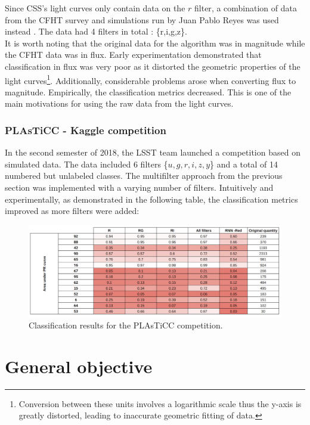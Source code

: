 Since CSS's light curves only contain data on the $r$ filter\cite{catalina}, a combination of data from the CFHT survey\cite{cfht} and simulations run by Juan Pablo Reyes was used instead . The data had 4 filters in total : \{r,i,g,z\}.\\

It is worth noting that the original data for the algorithm was in magnitude while the CFHT data was in flux. Early experimentation demonstrated that classification in flux was very poor as it distorted the geometric properties of the light curves\footnote{Conversion between these units involves a logarithmic scale thus the y-axis is greatly distorted, leading to inaccurate geometric fitting of data.}. Additionally, considerable problems arose when converting flux to magnitude. Empirically, the classification metrics decreased. This is one of the main motivations for using the raw data from the light curves. 

\subsubsection{PLAsTiCC - Kaggle competition}

In the second semester of 2018, the LSST team launched a competition based on simulated data\cite{kaggle}. The data included 6 filters \{$u, g, r, i, z, y$\} and a total of 14 numbered but unlabeled classes. The multifilter approach from the previous section was implemented with a varying number of filters. Intuitively and experimentally, as demonstrated in the following table, the classification metrics improved as more filters were added: 

\begin{figure}[H]
  \centering
  \includegraphics[width=1.05\textwidth]{images/competition.png}
  \caption{Classification results for the PLAsTiCC competition.}
\end{figure}




\section{General objective}
